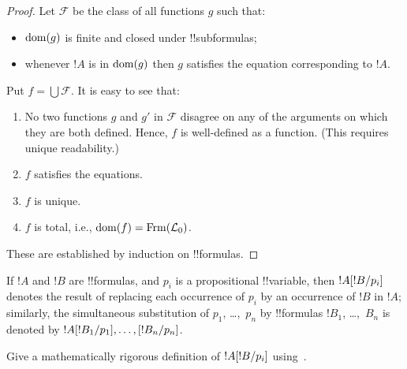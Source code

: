 \documentclass[../../include/open-logic-section]{subfiles}
\begin{document}
\begin{proof}
Let $\mathcal{F}$ be the class of all functions $g$ such that:
\begin{itemize}
\item $\mathrm{dom}(g)$ is finite and closed under !!{subformula}s;
\item whenever $!A$ is in $\mathrm{dom}(g)$ then $g$ satisfies the
    equation corresponding to $!A$.
\end{itemize}
Put $f = \bigcup \mathcal{F}$. It is easy to see that: 
\begin{enumerate}
\item No two functions $g$ and $g'$ in $\mathcal{F}$ disagree on any
  of the arguments on which they are both defined. Hence, $f$ is
  well-defined as a function. (This requires unique readability.)
\item $f$ satisfies the equations.
\item $f$ is unique.
\item $f$ is total, i.e., $\dom{f} = \Frm[L_0]$.
\end{enumerate}
These are established by induction on !!{formula}s.
\end{proof}

\begin{defn} 
If $!A$ and $!B$ are !!{formula}s, and $p_i$ is a propositional
!!{variable}, then $!A[!B/p_i]$ denotes the result of
replacing each occurrence of $p_i$ by an occurrence of $!B$ in $!A$;
similarly, the simultaneous substitution of $p_1$, \dots,~$p_n$ by
!!{formula}s $!B_1$, \dots,~$\!B_n$ is denoted by
$!A[!B_1/p_1],\ldots, [!B_n/p_n]$.
\end{defn}

\begin{prob}
Give a mathematically rigorous definition of $!A[!B/p_i]$
using~.
\end{prob}
\end{document}
